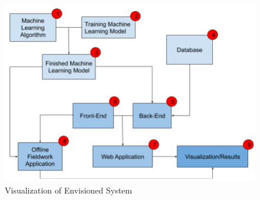 \documentclass[12pt,journal,compsoc]{IEEEtran}
\begin{document}
%
%
\begin{figure}[H]
\centering
\includegraphics[width=7in]{flow_chart.png}
\caption{Visualization of Envisioned System}
\label{fig:final_sys}
\end{figure}
\end{document}
